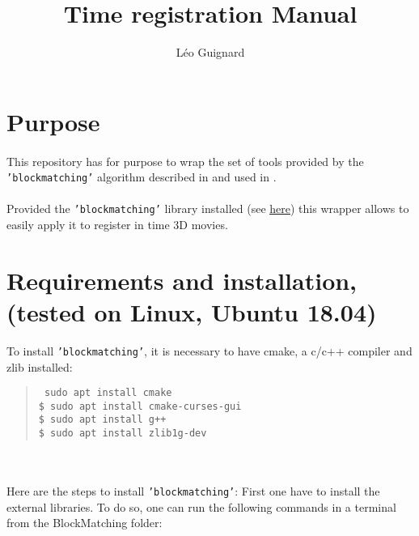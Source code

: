 \documentclass[10pt,a4paper]{article}
\author{L\'eo Guignard}
\title{Time registration Manual}
\newcommand{\option}[1]{{\texttt{'#1'}}}
\newenvironment{code}[1]{\mbox{}\\[1ex]\hspace*{-#1cm}\begin{minipage}{150mm}\begin{quote}\tt}{\end{quote}\end{minipage}\mbox{}\\[1ex]}
\begin{document}
\maketitle
\tableofcontents
\clearpage
\section{Purpose}
\paragraph{}This repository has for purpose to wrap the set of tools provided by the \option{blockmatching} algorithm described in \citep{Ourselin:2000aa} and used in \citep{McDole:2018aa,Guignard:2017aa,Guignard:2014aa}.
\paragraph{}Provided the \option{blockmatching} library installed (see \href{https://gitlab.inria.fr/greg/Klab-BlockMatching}{\underline{here}}) this wrapper allows to easily apply it to register in time 3D movies.
\section{Requirements and installation, (tested on Linux, Ubuntu 18.04)}
To install \option{blockmatching}, it is necessary to have cmake, a c/c++ compiler and zlib installed:
  \begin{code}{0.8}
    \$ sudo apt install cmake \\
    \$ sudo apt install cmake-curses-gui \\
    \$ sudo apt install g++ \\
    \$ sudo apt install zlib1g-dev
  \end{code}\\
  
Here are the steps to install \option{blockmatching}:
First one have to install the external libraries. To do so, one can run the following commands in a terminal from the BlockMatching folder:\\
\end{document}
